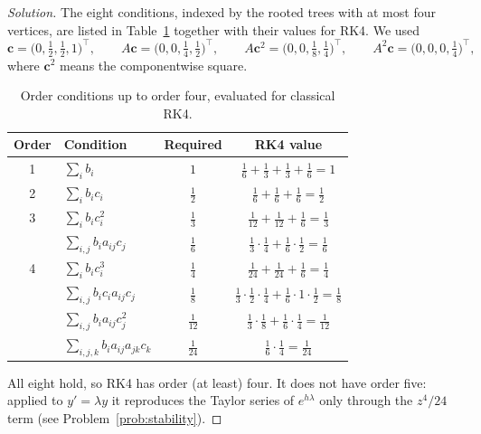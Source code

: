 \documentclass[11pt]{article}
\theoremstyle{definition}
\newenvironment{solution}{\begin{proof}[Solution]}{\end{proof}}
\begin{document}
\begin{solution}
The eight conditions, indexed by the rooted trees with at most four vertices, are listed in Table~\ref{tab:order-conditions} together with their values for RK4. We used
\[
  \mathbf{c} = \bigl(0, \tfrac12, \tfrac12, 1\bigr)^{\!\top}, \qquad
  A\mathbf{c} = \bigl(0, 0, \tfrac14, \tfrac12\bigr)^{\!\top}, \qquad
  A\mathbf{c}^2 = \bigl(0, 0, \tfrac18, \tfrac14\bigr)^{\!\top}, \qquad
  A^2\mathbf{c} = \bigl(0, 0, 0, \tfrac14\bigr)^{\!\top},
\]
where $\mathbf{c}^2$ means the componentwise square.

\begin{table}[ht]
  \centering
  \caption{Order conditions up to order four, evaluated for classical RK4.}
  \label{tab:order-conditions}
  \begin{tabular}{@{}clcc@{}}
    \toprule
    Order & Condition & Required & RK4 value \\
    \midrule
    1 & $\sum_i b_i$                      & $1$            & $\tfrac16 + \tfrac13 + \tfrac13 + \tfrac16 = 1$ \\[2pt]
    2 & $\sum_i b_i c_i$                  & $\tfrac12$     & $\tfrac16 + \tfrac16 + \tfrac16 = \tfrac12$ \\[2pt]
    3 & $\sum_i b_i c_i^2$                & $\tfrac13$     & $\tfrac1{12} + \tfrac1{12} + \tfrac16 = \tfrac13$ \\
      & $\sum_{i,j} b_i a_{ij} c_j$       & $\tfrac16$     & $\tfrac13\cdot\tfrac14 + \tfrac16\cdot\tfrac12 = \tfrac16$ \\[2pt]
    4 & $\sum_i b_i c_i^3$                & $\tfrac14$     & $\tfrac1{24} + \tfrac1{24} + \tfrac16 = \tfrac14$ \\
      & $\sum_{i,j} b_i c_i a_{ij} c_j$   & $\tfrac18$     & $\tfrac13\cdot\tfrac12\cdot\tfrac14 + \tfrac16\cdot 1\cdot\tfrac12 = \tfrac18$ \\
      & $\sum_{i,j} b_i a_{ij} c_j^2$     & $\tfrac1{12}$  & $\tfrac13\cdot\tfrac18 + \tfrac16\cdot\tfrac14 = \tfrac1{12}$ \\
      & $\sum_{i,j,k} b_i a_{ij} a_{jk} c_k$ & $\tfrac1{24}$ & $\tfrac16\cdot\tfrac14 = \tfrac1{24}$ \\
    \bottomrule
  \end{tabular}
\end{table}

All eight hold, so RK4 has order (at least) four. It does not have order five: applied to $y' = \lambda y$ it reproduces the Taylor series of $e^{h\lambda}$ only through the $z^4/24$ term (see Problem~\ref{prob:stability}).
\end{solution}
\end{document}
